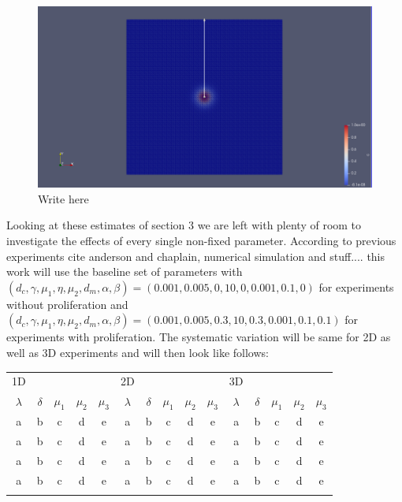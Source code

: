 \begin{figure}
    \centering
    \includegraphics[width=\textwidth]{resources/images/method_photo.png}
    \caption{Write here}
    \label{fig:PlotOverLine}
\end{figure}

Looking at these estimates of section 3 we are left with plenty of room to investigate the effects of every single non-fixed parameter. According to previous experiments cite anderson and chaplain, numerical simulation and stuff.... this work will use the baseline set of parameters with $(d_c, \gamma, \mu_1, \eta, \mu_2, d_m, \alpha, \beta) = (0.001, 0.005, 0, 10, 0, 0.001,0.1, 0)$ for experiments without proliferation and \newline
$(d_c, \gamma, \mu_1, \eta, \mu_2, d_m, \alpha, \beta) = (0.001, 0.005, 0.3, 10, 0.3, 0.001,0.1, 0.1)$ for experiments with proliferation.
The systematic variation will be same for 2D as well as 3D experiments and will then look like follows: 

\begin{center}
    \begin{tabular}{|| c | c | c | c | c || c | c | c | c | c || c | c | c | c | c ||}
        \hhline{||=|=|=|=|=||=|=|=|=|=||=|=|=|=|=||}
        1D \small & & & & & 2D & & & & & 3D & & & & \\
        \hhline{||=|=|=|=|=||=|=|=|=|=||=|=|=|=|=||}
        $\lambda$ & $\delta$ & $\mu_1$ & $\mu_2$ & $\mu_3$  & $\lambda$ & $\delta$ & $\mu_1$ & $\mu_2$ & $\mu_3$ & $\lambda$ & $\delta$ & $\mu_1$ & $\mu_2$ & $\mu_3$ \\ 
        \hline
        a & b & c & d & e & a & b & c & d & e & a & b & c & d & e \\ \hline 
        a & b & c & d & e & a & b & c & d & e & a & b & c & d & e \\ \hline 
        a & b & c & d & e & a & b & c & d & e & a & b & c & d & e \\ \hline 
        a & b & c & d & e & a & b & c & d & e & a & b & c & d & e \\ \hhline{||=|=|=|=|=||=|=|=|=|=||=|=|=|=|=||} 
    
    \end{tabular}
\end{center}

